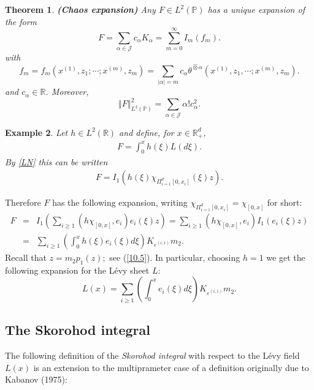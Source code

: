 \documentclass[12pt]{article}%
\newtheorem{theorem}{Theorem}[section]
\newtheorem{example}[theorem]{Example}
\numberwithin{equation}{section}
\def\P{\mathbb{P}}
\def\R{\mathbb{R}}
\begin{document}
\begin{theorem}
\label{Th10.2}
{\bf (Chaos expansion)}
\newline Any $F\in L^{2}(\P)$
has a unique expansion of the form
\begin{equation}
F=\sum_{\alpha \in \mathcal{J}}c_{\alpha }K_{\alpha }= \sum_{m=0}^\infty I_m(f_m).
\label{10.14}
\end{equation}
with
\begin{equation}
f_m=f_m (x^{(1)},z_{1};\cdots ; x^{(m)},z_{m})=\sum_{\left\vert \alpha \right\vert
=m}c_{\alpha }\theta ^{\hat{\otimes }\alpha
}(x^{(1)},z_{1},\cdots ; x^{(m)},z_{m}).
\end{equation}
and $c_{\alpha }\in \mathbb{R}$. 
Moreover,
\begin{equation}
\left\Vert F\right\Vert _{L^{2}(\P)}^{2}=\sum_{\alpha \in \mathcal{J}}\alpha
!c_{\alpha }^{2}.  \label{10.15}
\end{equation}
\end{theorem}

\begin{example}
\label{Ex10.3}
Let $h\in L^{2}(\mathbb{R})$ and define, for $x \in \R_+^d$,
\begin{align}
F=\int_0^{x} h(\xi)L(d\xi).
\end{align}
By  \eqref{LN} this can be written
\begin{align}
    F=I_{1}(h(\xi)\chi_{\Pi_{i=1}^d [0,x_i]}(\xi)z).
\end{align}
\end{example}
Therefore $F$ has the following expansion, writing $\chi_{\Pi_{i=1}^d [0,x_i]}=\chi_{[0,x]}$ for short:
\begin{eqnarray}
F &=&I_{1}(\sum_{i\geq 1}(h\chi_{[0,x]},e _{i})e _{i}(\xi)z)=\sum_{i\geq 1}(h\chi_{[0,x]},e
_{i})I_{1}(e _{i}(\xi)z) \\
&=&\sum_{i\geq 1}\left( \int_0^x h(\xi)e _{i}(\xi)d\xi\right)
K_{\varepsilon ^{(i,1)}}m_{2}.  \nonumber
\end{eqnarray}
Recall that $z=m_{2}p_{1}(z);$ see (\ref{10.5}).
In particular, choosing $h=1$ we get the following expansion for the L\' evy sheet $L$:
\begin{equation}
L(x)=\sum_{i\geq 1}\left( \int_{0}^{x}e _{i}(\xi)d\xi\right)
K_{\varepsilon ^{(i,1)}}m_{2}.  \label{LK}
\end{equation}

\subsection{The Skorohod integral}
The following definition of the {\it Skorohod integral} with respect to the L\'{e}vy field $L(x)$ is an extension to the  multiprameter case of a definition originally due to Kabanov
(1975):
\bigskip
\end{document}
